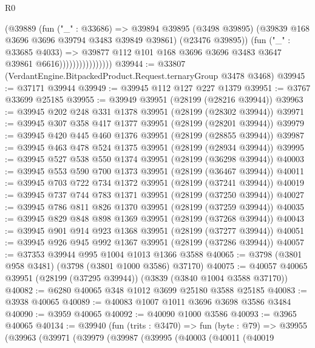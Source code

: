 \begin{lexlean}{R0}
\begin{coremodule}
                                (@39889
                                  (fun ("_" : @33686) =>
                                  @39894
                                    @39895
                                    (@3498 @39895)
                                    (@39839 @168 @3696 @3696 @39794 @3483 @39849 @39861)
                                    (@23476 @39895))
                                  (fun ("_" : @33685 @4033) =>
                                  @39877
                                    @112
                                    @101
                                    @168
                                    @3696
                                    @3696
                                    @3483
                                    @3647
                                    @39861
                                    @6616))))))))))))))))
@39944 := @33807 (VerdantEngine.BitpackedProduct.Request.ternaryGroup @3478 @3468)
@39945 := @37171 @39944
@39949 := @39945 @112 @127 @227 @1379
@39951 := @3767 @33699 @25185
@39955 := @39949 @39951 (@28199 (@28216 @39944))
@39963 := @39945 @202 @248 @331 @1378 @39951 (@28199 (@28302 @39944))
@39971 := @39945 @307 @358 @417 @1377 @39951 (@28199 (@28201 @39944))
@39979 := @39945 @420 @445 @460 @1376 @39951 (@28199 (@28855 @39944))
@39987 := @39945 @463 @478 @524 @1375 @39951 (@28199 (@28934 @39944))
@39995 := @39945 @527 @538 @550 @1374 @39951 (@28199 (@36298 @39944))
@40003 := @39945 @553 @590 @700 @1373 @39951 (@28199 (@36467 @39944))
@40011 := @39945 @703 @722 @734 @1372 @39951 (@28199 (@37241 @39944))
@40019 := @39945 @737 @744 @783 @1371 @39951 (@28199 (@37250 @39944))
@40027 := @39945 @786 @811 @826 @1370 @39951 (@28199 (@37259 @39944))
@40035 := @39945 @829 @848 @898 @1369 @39951 (@28199 (@37268 @39944))
@40043 := @39945 @901 @914 @923 @1368 @39951 (@28199 (@37277 @39944))
@40051 := @39945 @926 @945 @992 @1367 @39951 (@28199 (@37286 @39944))
@40057 := @37353 @39944 @995 @1004 @1013 @1366 @3588
@40065 := @3798 (@3801 @958 @3481) (@3798 (@3801 @1000 @3586) @37170)
@40075 := @40057 @40065 @39951 (@28199 (@37295 @39944)) (@3839 (@3840 @1004 @3588 @37170))
@40082 := @6280 @40065 @348 @1012 @3699 @25180 @3588 @25185
@40083 := @3938 @40065
@40089 := @40083 @1007 @1011 @3696 @3698 @3586 @3484
@40090 := @3959 @40065
@40092 := @40090 @1000 @3586
@40093 := @3965 @40065
@40134 := @39940
    (fun (trits : @3470) =>
    fun (byte : @79) =>
    @39955
      (@39963
        (@39971
          (@39979
            (@39987
              (@39995
                (@40003
                  (@40011
                    (@40019

\end{coremodule}
\end{lexlean}
